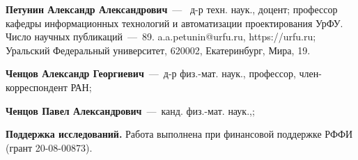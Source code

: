 \documentclass[10pt]{SPIIRAS_Proceedings}
\begin{document}
\begin{aboutAuthors}

\textbf{Петунин Александр Александрович}~---~
д-р техн. наук., доцент;
профессор кафедры информационных технологий и автоматизации проектирования УрФУ.
Число научных публикаций~---~89.
a.a.petunin@urfu.ru,
https://urfu.ru;
Уральский Федеральный университет,
620002, Екатеринбург, Мира, 19.
\smallskip

\textbf{Ченцов Александр Георгиевич}~---~д-р физ.-мат. наук., профессор, член-корреспондент РАН;
\smallskip

\textbf{Ченцов Павел Александрович}~---~канд. физ.-мат. наук.,;
\smallskip

\textbf{Поддержка исследований.}
Работа выполнена при финансовой поддержке РФФИ (грант 20-08-00873).

\end{aboutAuthors}
\end{document}
